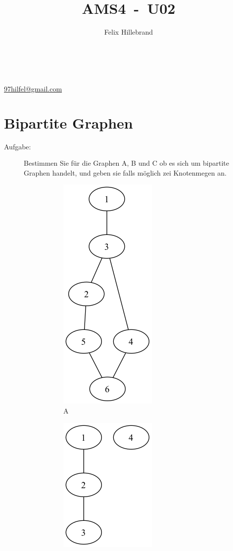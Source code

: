 \documentclass[a4paper,11pt]{report}
\author{Felix Hillebrand}
\makeatletter
\newcommand{\coverpage}{
    \thispagestyle{cover}
    \begin{center}
        {\LARGE \thetitle}\\[0.5cm]
        {\large \theauthor}\\
        \href{mailto:97hilfel@gmail.com}{97hilfel@gmail.com}\\
    \end{center}
    \tableofcontents
    \clearpage
}
\makeatother
\begin{document}

\title{AMS4~-~U02}
\coverpage

\clearpage
{}
\pagestyle{main}

\chapter{Bipartite Graphen}
    \begin{description}
        \item[Aufgabe:] Bestimmen Sie für die Graphen A, B und C ob es sich um bipartite Graphen handelt, und geben sie falls möglich zei Knotenmegen an. \hfill
        \begin{figure}[htbp]
            \centering
            \begin{subfigure}[b]{0.3\textwidth}
                \includegraphics[height=0.2\textheight]{images/A}
                \caption{A}
                \label{fig:a01_a}
            \end{subfigure}
            \hfill
            \begin{subfigure}[b]{0.3\textwidth}
                \includegraphics[height=0.2\textheight]{images/B}

\end{subfigure}
\end{figure}
\end{description}
\end{document}
